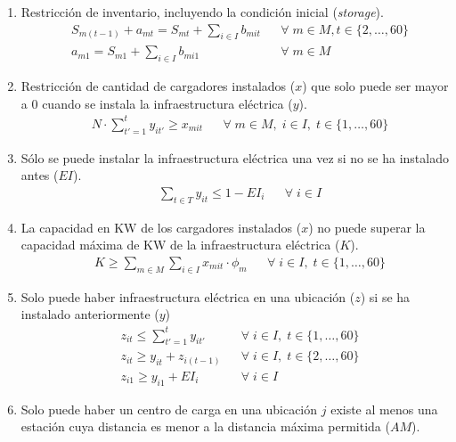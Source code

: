 \documentclass[letterpaper]{article}
\begin{document}
\begin{flushleft}
	\begin{enumerate}
		\item Restricción de inventario, incluyendo la condici\'on inicial (\textit{storage}).
		      \begin{align*}
			       & S_{m(t-1)} + a_{mt} = S_{mt} + \sum_{i \in I} b_{mit} &  & \forall \; m \in M, t \in \{2, \ldots, 60\} \\
			       & a_{m1} = S_{m1} + \sum_{i \in I} b_{mi1}              &  & \forall \; m \in M
		      \end{align*}
		\item Restricción de cantidad de cargadores instalados ($x$) que solo puede ser mayor a $0$ cuando se instala la infraestructura eléctrica ($y$).
		      \begin{align*}
			       & N \cdot \sum_{t'=1}^{t} y_{it'} \geq x_{mit} &  & \forall \; m \in M, \; i \in I,\; t \in \{1, \ldots, 60\}
		      \end{align*}
		\item S\'olo se puede instalar la infraestructura el\'ectrica una vez si no se ha instalado antes ($EI$).
		      \begin{align*}
			       & \sum_{t \in T} y_{it} \leq 1 - EI_i &  & \forall \; i \in I
		      \end{align*}
		\item La capacidad en KW de los cargadores instalados ($x$) no puede superar la capacidad m\'axima de KW de la infraestructura el\'ectrica ($K$).
		      \begin{align*}
			       & K \geq \sum_{m \in M} \sum_{i \in I} x_{mit} \cdot \phi_m &  & \forall \; i \in I, \; t \in \{1, \ldots, 60\}
		      \end{align*}
		\item Solo puede haber infraestructura el\'ectrica en una ubicaci\'on ($z$) si se ha instalado anteriormente ($y$)
		      \begin{align*}
			       & z_{it} \leq \sum_{t'=1}^{t} y_{it'} &  & \forall \; i \in I, \; t \in \{1, \ldots, 60\} \\
			       & z_{it} \geq y_{it} + z_{i(t-1)}     &  & \forall \; i \in I, \;t \in \{2, \ldots, 60\}  \\
			       & z_{i1} \geq y_{i1} + EI_i           &  & \forall \; i \in I
		      \end{align*}
		\item Solo puede haber un centro de carga en una ubicaci\'on $j$ existe al menos una estaci\'on cuya distancia es menor a la distancia m\'axima permitida ($AM$).

\end{enumerate}
\end{flushleft}
\end{document}
